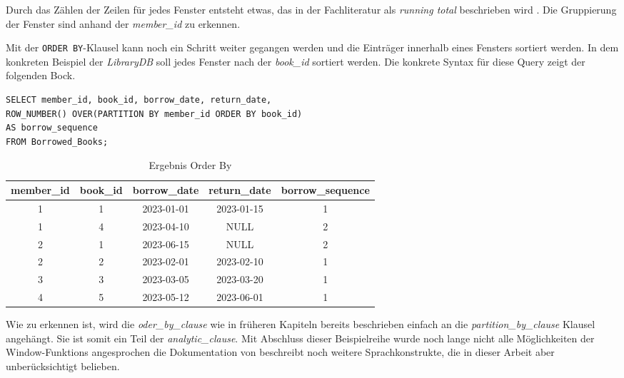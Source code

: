 Durch das Zählen der Zeilen für jedes Fenster entsteht etwas, das in der Fachliteratur
als \textit{running total} beschrieben wird \citep{Nuijten2023}. Die Gruppierung
der Fenster sind anhand der \textit{member\_id} zu erkennen.

Mit der \texttt{ORDER BY}-Klausel kann noch ein Schritt weiter gegangen werden
und die Einträger innerhalb eines Fensters sortiert werden. In dem konkreten Beispiel
der \textit{LibraryDB} soll jedes Fenster nach der \textit{book\_id} sortiert werden.
Die konkrete Syntax für diese Query zeigt der folgenden Bock.

\begin{lstlisting}
SELECT member_id, book_id, borrow_date, return_date,
ROW_NUMBER() OVER(PARTITION BY member_id ORDER BY book_id)
AS borrow_sequence
FROM Borrowed_Books;
\end{lstlisting}
\begin{table}[h]
	\centering
	\begin{tabular}{|c|c|c|c|c|}
		\hline
		\textbf{member\_id} & \textbf{book\_id} & \textbf{borrow\_date} & \textbf{return\_date} & \textbf{borrow\_sequence} \\
		\hline
		1                   & 1                 & 2023-01-01            & 2023-01-15            & 1                         \\
		\hline
		1                   & 4                 & 2023-04-10            & NULL                  & 2                         \\
		\hline
		2                   & 1                 & 2023-06-15            & NULL                  & 2                         \\
		\hline
		2                   & 2                 & 2023-02-01            & 2023-02-10            & 1                         \\
		\hline
		3                   & 3                 & 2023-03-05            & 2023-03-20            & 1                         \\
		\hline
		4                   & 5                 & 2023-05-12            & 2023-06-01            & 1                         \\
		\hline
	\end{tabular}
	\caption{Ergebnis Order By}
	\label{tab:member_borrows}
\end{table}

Wie zu erkennen ist, wird die \textit{oder\_by\_clause} wie in früheren Kapiteln
bereits beschrieben einfach an die \textit{partition\_by\_clause} Klausel
angehängt. Sie ist somit ein Teil der \textit{analytic\_clause}. Mit Abschluss dieser
Beispielreihe wurde noch lange nicht alle Möglichkeiten der Window-Funktions angesprochen
die Dokumentation von \citet{oracle} beschreibt noch weitere Sprachkonstrukte, die
in dieser Arbeit aber unberücksichtigt belieben.

